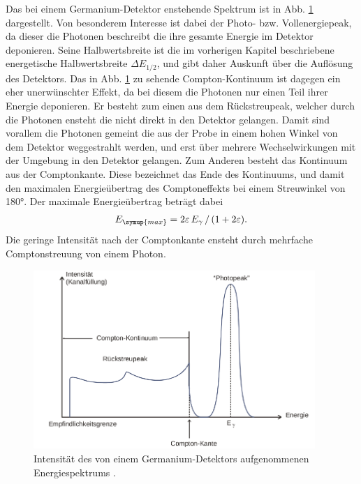 Das bei einem Germanium-Detektor enstehende Spektrum ist in Abb. \ref{fig:spektrum}
dargestellt. Von besonderem Interesse ist dabei der Photo- bzw. Vollenergiepeak, da
dieser die Photonen beschreibt die ihre gesamte Energie im Detektor deponieren.
Seine Halbwertsbreite ist die im vorherigen Kapitel beschriebene energetische Halbwertsbreite
$\Delta E_{1/2}$, und gibt daher Auskunft über die Auflösung des Detektors.
Das in Abb. \ref{fig:spektrum} zu sehende Compton-Kontinuum ist dagegen ein eher
unerwünschter Effekt, da bei diesem die Photonen nur einen Teil ihrer Energie deponieren.
Er besteht zum einen aus dem Rückstreupeak, welcher durch die Photonen ensteht die
nicht direkt in den Detektor gelangen. Damit sind vorallem die Photonen gemeint die
aus der Probe in einem hohen Winkel von dem Detektor weggestrahlt werden, und erst über mehrere
Wechselwirkungen mit der Umgebung in den Detektor gelangen. Zum Anderen besteht das
Kontinuum aus der Comptonkante. Diese bezeichnet das Ende des Kontinuums, und damit den
maximalen Energieübertrag des Comptoneffekts bei einem Streuwinkel von 180°. Der
maximale Energieübertrag beträgt dabei
\begin{align}
  E_{\symup{max}} = 2\varepsilon\,E_\gamma\,/\,(1+2\varepsilon).
\end{align}
Die geringe Intensität nach der Comptonkante ensteht durch mehrfache Comptonstreuung
von einem Photon.\\
\begin{figure}
  \centering
  \includegraphics[width=0.95\textwidth]{spektrum.png}
  \caption{Intensität des von einem Germanium-Detektors aufgenommenen
   Energiespektrums  \cite{anleitungv18}.}
  \label{fig:spektrum}
\end{figure}

